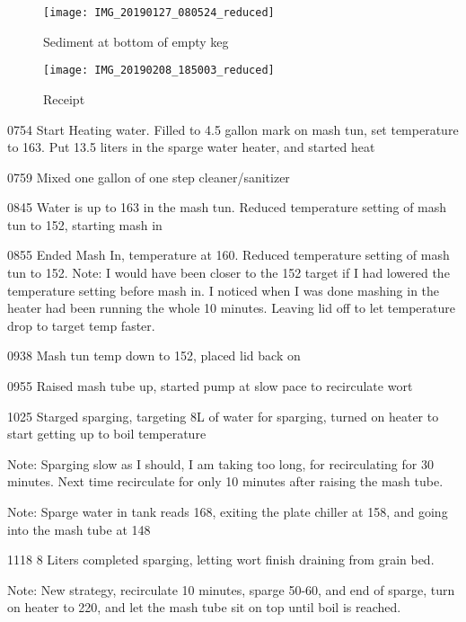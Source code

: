 \begin{figure}[H]
  \centering
  \texttt{[image: IMG\_20190127\_080524\_reduced]}
  \caption{Sediment at bottom of empty keg}\label{fig:keg1:empty}
\end{figure}

\begin{figure}[H]
  \centering
  \texttt{[image: IMG\_20190208\_185003\_reduced]}
  \caption{Receipt}\label{fig:brew:receipt}
\end{figure}

\def\todaysdate{20190209}
\newday{\todaysdate}\label{\todaysdate}

\FloatBarrier{}
0754 Start Heating water.  Filled to 4.5 gallon mark on mash tun, set temperature to 163.  Put 13.5 liters in the sparge water heater, and started heat

0759 Mixed one gallon of one step cleaner/sanitizer

0845 Water is up to 163 in the mash tun. Reduced temperature setting of mash tun to 152, starting mash in

0855 Ended Mash In, temperature at 160.  Reduced temperature setting of mash tun to 152.  Note: I would have been closer to the 152 target if I had lowered the temperature setting before mash in.  I noticed when I was done mashing in the heater had been running the whole 10 minutes.  Leaving lid off to let temperature drop to target temp faster.

0938 Mash tun temp down to 152, placed lid back on

0955 Raised mash tube up, started pump at slow pace to recirculate wort

1025 Starged sparging, targeting 8L of water for sparging, turned on heater to start getting up to boil temperature

Note:  Sparging slow as I should, I am taking too long, for recirculating for 30 minutes.  Next time recirculate for only 10 minutes after raising the mash tube.

Note:  Sparge water in tank reads 168, exiting the plate chiller at 158, and going into the mash tube at 148

1118 8 Liters completed sparging, letting wort finish draining from grain bed.

Note: New strategy, recirculate 10 minutes, sparge 50-60, and end of sparge, turn on heater to 220, and let the mash tube sit on top until boil is reached.

